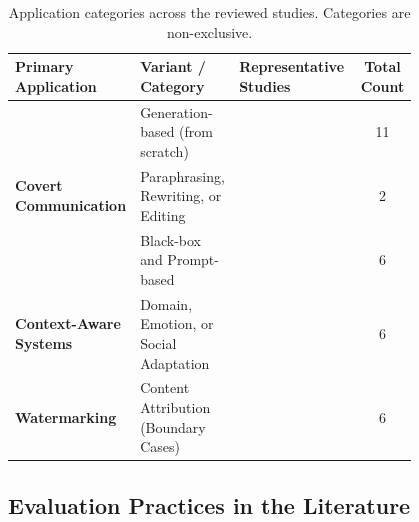 \begin{table}[t]
	\centering
	\small
	\caption{Application categories across the reviewed studies. Categories are non-exclusive.}
	\label{tab:app_distribution}
	\begin{tabular}{|p{0.2\linewidth}|p{0.25\linewidth}|p{0.35\linewidth}|c|}
		\hline
		\textbf{Primary Application}                   & \textbf{Variant / Category}           & \textbf{Representative Studies}                                                                                                                                                 & \textbf{Total Count} \\
		\hline
		\multirow{3}{*}{\textbf{Covert Communication}} & Generation-based (from scratch)       & \cite{yang2020vae,kaptchuk2021meteor,ding2023discop,ding2023joint,zhang2020linguistic,yi2022alisa,xiang2023cpg,pang2024fremax,qi2024provably,lin2025positionagnostic,chen2025activetwo} & 11                   \\
		\cline{2-4}
		                                               & Paraphrasing, Rewriting, or Editing   & \cite{li2023rewriting,zheng2022general}                                                                                                                                         & 2                    \\
		\cline{2-4}
		                                               & Black-box and Prompt-based            & \cite{wu2024generative,steinebach2024natural,lin2024zero,li2024semantic,kuznetsov2025deepstego,wozniak2025multicriteria}                                                        & 6                    \\
		\hline
		\textbf{Context-Aware Systems}                 & Domain, Emotion, or Social Adaptation & \cite{liao2024co,wang2023hi,ding2023context,li2024imperceptible,zhang2024controllable,shi2025emotionally}                                                                       & 6                    \\
		\hline
		\textbf{Watermarking}                          & Content Attribution (Boundary Cases)  & \cite{ji2024principled,munyer2024deeptextmark,qiang2023natural,xu2024beyond,hao2025robust,wang2025contrastive}                                                                  & 6                    \\
		\hline
	\end{tabular}
\end{table}

\subsection{Evaluation Practices in the Literature}
\label{sec:related-rq3}

